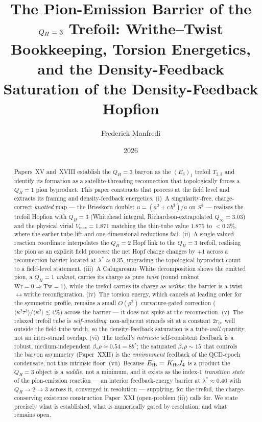 \documentclass[11pt,a4paper]{article}
\title{\textbf{The Pion-Emission Barrier of the $\QH=3$ Trefoil:
Writhe--Twist Bookkeeping, Torsion Energetics, and the Density-Feedback
Saturation of the Density-Feedback Hopfion}}
\author{Frederick Manfredi}
\date{2026}
\theoremstyle{definition}\newtheorem{definition}[theorem]{Definition}
\newcommand{\QH}{Q_H}
\newcommand{\Wr}{\mathrm{Wr}}
\newcommand{\Tw}{\mathrm{Tw}}
\begin{document}
\maketitle

\begin{abstract}
Papers~XV and~XVIII establish the $\QH=3$ baryon as the $(E_6)_1$ trefoil $T_{2,3}$ and
identify its formation as a satellite-threading reconnection that topologically forces a
$\QH=1$ pion byproduct. This paper constructs that process at the field level and extracts its
framing and density-feedback energetics. (i)~A singularity-free, charge-correct \emph{knotted}
map --- the Brieskorn doublet $u=(a^2+c\,b^3)/a$ on $S^3$ --- realises the trefoil Hopfion with
$\QH=3$ (Whitehead integral, Richardson-extrapolated $Q_\infty=3.03$) and the physical virial
$V_{\max}=1.871$ matching the thin-tube value $1.875$ to $<0.3\%$, where the earlier tube-lift
and one-dimensional reductions fail. (ii)~A single-valued reaction coordinate interpolates the
$\QH=2$ Hopf link to the $\QH=3$ trefoil, realising the pion as an explicit field process: the
net Hopf charge changes by $+1$ across a reconnection barrier located at $\lambda^\ast\approx0.35$,
upgrading the topological byproduct count to a field-level statement. (iii)~A
Calugareanu--White decomposition shows the emitted pion, a $\QH=1$ \emph{unknot}, carries its
charge as pure \emph{twist} (round unknot $\Wr=0\Rightarrow\Tw=1$), while the trefoil carries
its charge as \emph{writhe}; the barrier is a twist$\leftrightarrow$writhe reconfiguration.
(iv)~The torsion energy, which cancels at leading order for the symmetric profile, remains a
small $O(\rho^2)$ curvature-gated correction ($\langle\kappa^2\tau^2\rangle/\langle\kappa^2\rangle
\lesssim4\%$) across the barrier --- it does not spike at the reconnection. (v)~The relaxed
trefoil tube is \emph{self-avoiding}: non-adjacent strands sit at a constant $2r_0$, well outside
the field-tube width, so the density-feedback saturation is a tube-\emph{wall} quantity, not an
inter-strand overlap. (vi)~The trefoil's \emph{intrinsic} self-consistent feedback is a robust,
medium-independent $\beta_*\rho\simeq0.54=8b^\ast$; the saturated $\beta_*\rho\sim15$ that
controls the baryon asymmetry (Paper~XXII) is the \emph{environment} feedback of the QCD-epoch
condensate, not this intrinsic floor. (vii)~Because $E_{\rm fb}=K_{\rm fb}J_4$ is a product the
$\QH=3$ object is a \emph{saddle}, not a minimum, and it exists as the index-1 \emph{transition
state} of the pion-emission reaction --- an interior feedback-energy barrier at
$\lambda^\ast\approx0.40$ with $\QH\!\to\!2\!\to\!3$ across it, converged in resolution ---
supplying, for the trefoil, the charge-conserving existence construction Paper~XXI
(open-problem (ii)) calls for. We state precisely what is established, what is numerically gated
by resolution, and what remains open.
\end{abstract}
\end{document}
